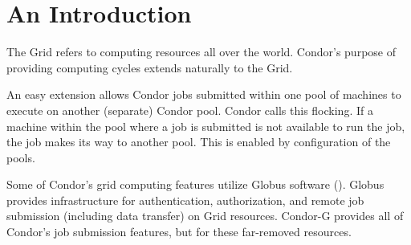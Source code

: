 \section{\label{sec:grids-intro}An Introduction}

The Grid refers to computing resources all over the world. 
Condor's purpose of providing computing cycles extends naturally
to the Grid.

An easy extension allows Condor jobs submitted within one pool
of machines to execute on another (separate) Condor pool.
Condor calls this flocking.
If a machine within the pool where a job is submitted is not
available to run the job,
the job makes its way to another pool.
This is enabled by configuration of the pools.

Some of Condor's grid computing features utilize Globus software
().
Globus provides infrastructure for authentication, authorization,
and remote job submission (including data transfer) on Grid resources.
Condor-G provides all of Condor's job submission features,
but for these far-removed resources.
